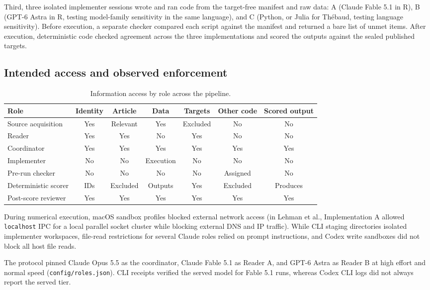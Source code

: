 \documentclass[11pt]{article}
\newcommand{\artifact}[1]{\nolinkurl{#1}}
\begin{document}
Third, three isolated implementer sessions wrote and ran code from the target-free manifest and raw data: A (Claude Fable 5.1 in R), B (GPT-6 Astra in R, testing model-family sensitivity in the same language), and C (Python, or Julia for Th\'ebaud, testing language sensitivity). Before execution, a separate checker compared each script against the manifest and returned a bare list of unmet items. After execution, deterministic code checked agreement across the three implementations and scored the outputs against the sealed published targets.

\subsection{Intended access and observed enforcement}
\begin{table}[H]\centering\small
\begin{tabularx}{\linewidth}{@{}lcccccc@{}}\toprule
Role & Identity & Article & Data & Targets & Other code & Scored output\\\midrule
Source acquisition & Yes & Relevant & Yes & Excluded & No & No\\
Reader & Yes & Yes & No & Yes & No & No\\
Coordinator & Yes & Yes & Yes & Yes & Yes & Yes\\
Implementer & No & No & Execution & No & No & No\\
Pre-run checker & No & No & No & No & Assigned & No\\
Deterministic scorer & IDs & Excluded & Outputs & Yes & Excluded & Produces\\
Post-score reviewer & Yes & Yes & Yes & Yes & Yes & Yes\\\bottomrule
\end{tabularx}\caption{Information access by role across the pipeline.}\end{table}
During numerical execution, macOS sandbox profiles blocked external network access (in Lehman et al., Implementation A allowed \texttt{localhost} IPC for a local parallel socket cluster while blocking external DNS and IP traffic). While CLI staging directories isolated implementer workspaces, file-read restrictions for several Claude roles relied on prompt instructions, and Codex write sandboxes did not block all host file reads.

The protocol pinned Claude Opus 5.5 as the coordinator, Claude Fable 5.1 as Reader A, and GPT-6 Astra as Reader B at high effort and normal speed (\artifact{config/roles.json}). CLI receipts verified the served model for Fable 5.1 runs, whereas Codex CLI logs did not always report the served tier.
\end{document}
